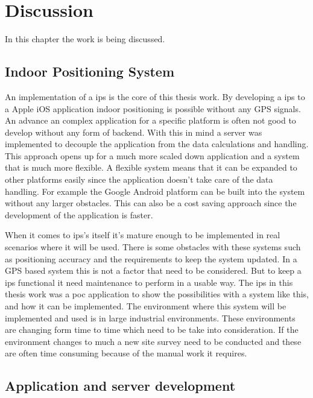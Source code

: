 \chapter{Discussion} \label{sec:discussion}
In this chapter the work is being discussed.

\section{Indoor Positioning System}\label{sec:discussionIps}
An implementation of a \acrfull{ips} is the core of this thesis work.
By developing a \acrshort{ips} to a Apple iOS application indoor positioning is possible without any GPS signals.
An advance an complex application for a specific platform is often not good to develop without any form of backend.
With this in mind a server was implemented to decouple the application from the data calculations and handling.
This approach opens up for a much more scaled down application and a system that is much more flexible.
A flexible system means that it can be expanded to other platforms easily since the application doesn't take care of the data handling.
For example the Google Android platform can be built into the system without any larger obstacles.
This can also be a cost saving approach since the development of the application is faster.

\bigskip

When it comes to \acrshort{ips}'s itself it's mature enough to be implemented in real scenarios where it will be used.
There is some obstacles with these systems such as positioning accuracy and the requirements to keep the system updated. 
In a GPS based system this is not a factor that need to be considered.
But to keep a \acrshort{ips} functional it need maintenance to perform in a usable way.
The \acrshort{ips} in this thesis work was a \acrfull{poc} application to show the possibilities with a system like this, and how it can be implemented.
The environment where this system will be implemented and used is in large industrial environments.
These environments are changing form time to time which need to be take into consideration.
If the environment changes to much a new site survey need to be conducted and these are often time consuming because of the manual work it requires.


\section{Application and server development}\label{sec:discussionAppDev}
